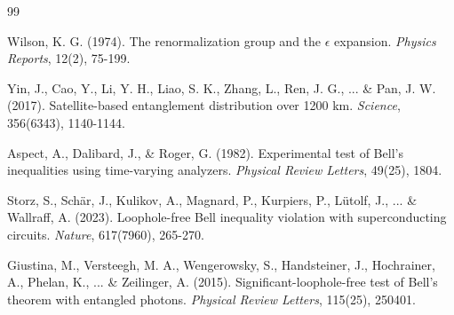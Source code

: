 \documentclass[11pt]{article}
\begin{document}
\newpage
\begin{thebibliography}{99}

Wilson, K. G. (1974). The renormalization group and the $\epsilon$ expansion. \textit{Physics Reports}, 12(2), 75-199.

Yin, J., Cao, Y., Li, Y. H., Liao, S. K., Zhang, L., Ren, J. G., ... \& Pan, J. W. (2017). Satellite-based entanglement distribution over 1200 km. \textit{Science}, 356(6343), 1140-1144.

Aspect, A., Dalibard, J., \& Roger, G. (1982). Experimental test of Bell's inequalities using time-varying analyzers. \textit{Physical Review Letters}, 49(25), 1804.

Storz, S., Schär, J., Kulikov, A., Magnard, P., Kurpiers, P., Lütolf, J., ... \& Wallraff, A. (2023). Loophole-free Bell inequality violation with superconducting circuits. \textit{Nature}, 617(7960), 265-270.

Giustina, M., Versteegh, M. A., Wengerowsky, S., Handsteiner, J., Hochrainer, A., Phelan, K., ... \& Zeilinger, A. (2015). Significant-loophole-free test of Bell's theorem with entangled photons. \textit{Physical Review Letters}, 115(25), 250401.

\end{thebibliography}
\end{document}
